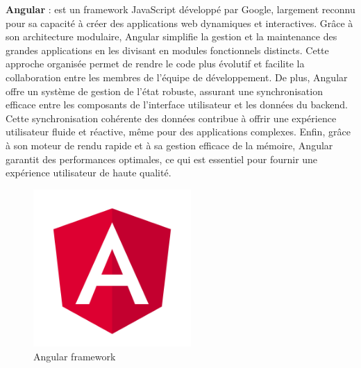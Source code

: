 \textbf{Angular} : est un framework JavaScript développé par Google, largement reconnu pour sa capacité à créer des applications web dynamiques et interactives. Grâce à son architecture modulaire, Angular simplifie la gestion et la maintenance des grandes applications en les divisant en modules fonctionnels distincts. Cette approche organisée permet de rendre le code plus évolutif et facilite la collaboration entre les membres de l'équipe de développement. De plus, Angular offre un système de gestion de l'état robuste, assurant une synchronisation efficace entre les composants de l'interface utilisateur et les données du backend. Cette synchronisation cohérente des données contribue à offrir une expérience utilisateur fluide et réactive, même pour des applications complexes. Enfin, grâce à son moteur de rendu rapide et à sa gestion efficace de la mémoire, Angular garantit des performances optimales, ce qui est essentiel pour fournir une expérience utilisateur de haute qualité.
\\
\begin{figure}[H]
    \centering
    \includegraphics[width=6cm]{Figures/angular.png}
    \caption{Angular framework}
\end{figure}



